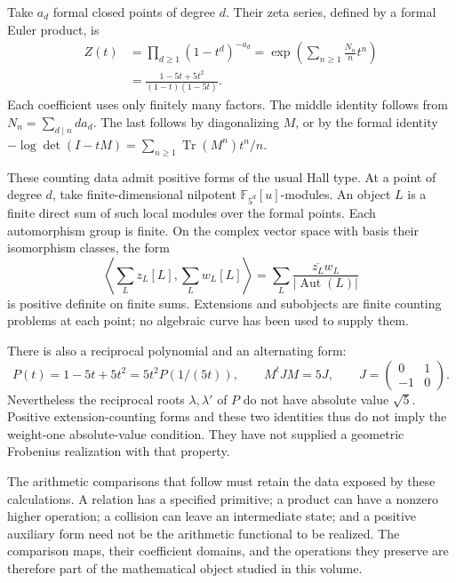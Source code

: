 Take \(a_d\) formal closed points of degree \(d\). Their zeta
series, defined by a formal Euler product, is
\begin{equation}\label{v4-prologue:eq:synthetic-zeta}
 \begin{split}
 Z(t)&=\prod_{d\ge1}(1-t^d)^{-a_d}
      =\exp\!\left(\sum_{n\ge1}\frac{N_n}{n}t^n\right)\\
     &=\frac{1-5t+5t^2}{(1-t)(1-5t)}.
 \end{split}
\end{equation}
Each coefficient uses only finitely many factors. The middle
identity follows from \(N_n=\sum_{d\mid n}d a_d\). The last
follows by diagonalizing \(M\), or by the formal identity
\(-\log\det(I-tM)=\sum_{n\ge1}\operatorname{Tr}(M^n)t^n/n\).

These counting data admit positive forms of the usual Hall type.
At a point of degree \(d\), take finite-dimensional nilpotent
\(\mathbb F_{5^d}[u]\)-modules. An object \(L\) is a finite
direct sum of such local modules over the formal points. Each
automorphism group is finite. On the complex vector space with
basis their isomorphism classes, the form
\[
 \left\langle\sum_L z_L[L],\sum_L w_L[L]\right\rangle
 =\sum_L\frac{\overline{z_L}w_L}{|\operatorname{Aut}(L)|}
\]
is positive definite on finite sums. Extensions and subobjects are
finite counting problems at each point; no algebraic curve has
been used to supply them.

There is also a reciprocal polynomial and an alternating form:
\[
 P(t)=1-5t+5t^2=5t^2P(1/(5t)),\qquad
 M^tJM=5J,\qquad
 J=\begin{pmatrix}0&1\\-1&0\end{pmatrix}.
\]
Nevertheless the reciprocal roots \(\lambda,\lambda'\) of
\(P\) do not have absolute value \(\sqrt5\).
Positive extension-counting forms and these two identities thus
do not imply the weight-one absolute-value condition. They have
not supplied a geometric Frobenius realization with that property.

The arithmetic comparisons that follow must retain the data exposed
by these calculations. A relation has a specified primitive; a
product can have a nonzero higher operation; a collision can leave
an intermediate state; and a positive auxiliary form need not be
the arithmetic functional to be realized. The comparison maps,
their coefficient domains, and the operations they preserve are
therefore part of the mathematical object studied in this volume.
